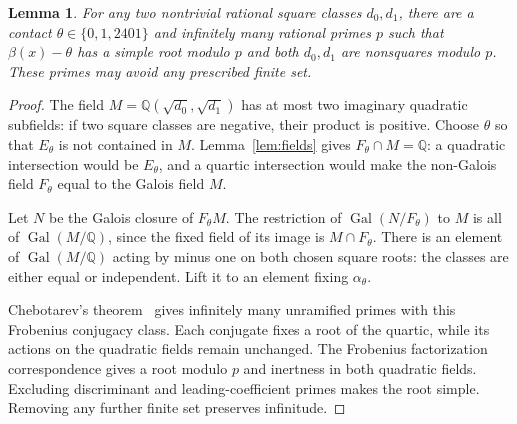 \documentclass[11pt,a4paper]{article}
\newtheorem{lemma}[theorem]{Lemma}
\newcommand{\Q}{\mathbb Q}\newcommand{\Z}{\mathbb Z}
\begin{document}
\begin{lemma}\label{lem:chebotarev}
For any two nontrivial rational square classes $d_0,d_1$, there are
a contact $\theta\in\{0,1,2401\}$ and infinitely many rational primes
$p$ such that $\beta(x)-\theta$ has a simple root modulo $p$ and
both $d_0,d_1$ are nonsquares modulo $p$. These primes may avoid
any prescribed finite set.
\end{lemma}
\begin{proof}
The field $M=\Q(\sqrt{d_0},\sqrt{d_1})$ has at most two imaginary
quadratic subfields: if two square classes are negative, their product
is positive. Choose $\theta$ so that $E_\theta$ is not contained in
$M$. Lemma~\ref{lem:fields} gives $F_\theta\cap M=\Q$: a quadratic
intersection would be $E_\theta$, and a quartic intersection would
make the non-Galois field $F_\theta$ equal to the Galois field $M$.

Let $N$ be the Galois closure of $F_\theta M$. The restriction of
$\operatorname{Gal}(N/F_\theta)$ to $M$ is all of
$\operatorname{Gal}(M/\Q)$, since the fixed field of its image is
$M\cap F_\theta$. There is an element of $\operatorname{Gal}(M/\Q)$
acting by minus one on both chosen square roots: the classes are
either equal or independent. Lift it to an element fixing
$\alpha_\theta$.

Chebotarev's theorem~\cite[Theorem~8.31]{Milne} gives infinitely many
unramified primes with this Frobenius conjugacy class. Each conjugate
fixes a root of the quartic, while its actions on the quadratic fields
remain unchanged. The Frobenius factorization correspondence
\cite[Corollary~8.22]{Milne} gives a root modulo $p$ and inertness
in both quadratic fields. Excluding discriminant and leading-coefficient
primes makes the root simple. Removing any further finite set preserves
infinitude.
\end{proof}
\end{document}
